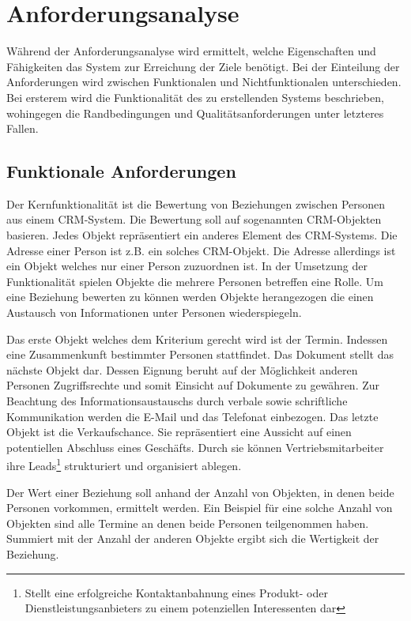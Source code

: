 \section{Anforderungsanalyse}
\label{ch:Systemanalyse:sec:Anforderungsanalyse}

Während der Anforderungsanalyse wird ermittelt, welche Eigenschaften und Fähigkeiten das System zur Erreichung der Ziele benötigt. Bei der Einteilung der Anforderungen wird zwischen Funktionalen und Nichtfunktionalen unterschieden. Bei ersterem wird die Funktionalität des zu erstellenden Systems beschrieben, wohingegen die Randbedingungen und Qualitätsanforderungen unter letzteres Fallen. 

\subsection{Funktionale Anforderungen}

Der Kernfunktionalität ist die Bewertung von Beziehungen zwischen Personen aus einem CRM-System. Die Bewertung soll auf sogenannten CRM-Objekten basieren. Jedes Objekt repräsentiert ein anderes Element des CRM-Systems. Die Adresse einer Person ist z.B. ein solches CRM-Objekt. Die Adresse allerdings ist ein Objekt welches nur einer Person zuzuordnen ist. In der Umsetzung der Funktionalität spielen Objekte die mehrere Personen betreffen eine Rolle. Um eine Beziehung bewerten zu können werden Objekte herangezogen die einen Austausch von Informationen unter Personen wiederspiegeln.
 
Das erste Objekt welches dem Kriterium gerecht wird ist der Termin. Indessen eine Zusammenkunft bestimmter Personen stattfindet. Das Dokument stellt das nächste Objekt dar. Dessen Eignung beruht auf der Möglichkeit anderen Personen Zugriffsrechte und somit Einsicht auf Dokumente zu gewähren. Zur Beachtung des Informationsaustauschs durch verbale sowie schriftliche Kommunikation werden die E-Mail und das Telefonat einbezogen. Das letzte Objekt ist die Verkaufschance. Sie repräsentiert eine Aussicht auf einen potentiellen Abschluss eines Geschäfts. Durch sie können Vertriebsmitarbeiter ihre Leads\footnote{Stellt eine erfolgreiche Kontaktanbahnung eines Produkt- oder Dienstleistungsanbieters zu einem potenziellen Interessenten dar} strukturiert und organisiert ablegen.

Der Wert einer Beziehung soll anhand der Anzahl von Objekten, in denen beide Personen vorkommen, ermittelt werden. Ein Beispiel für eine solche Anzahl von Objekten sind alle Termine an denen beide Personen teilgenommen haben. Summiert mit der Anzahl der anderen Objekte ergibt sich die Wertigkeit der Beziehung. 

